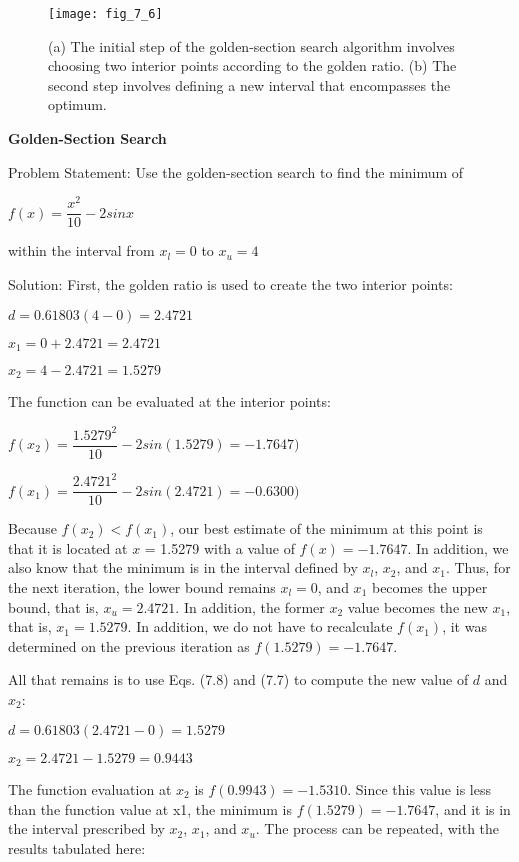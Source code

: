 \documentclass[../main.tex]{subfiles}
\begin{document}
\begin{figure}[H]
	\centering
	\texttt{[image: fig\_7\_6]}
	\caption{\textsf{(a) The initial step of the golden-section search algorithm involves choosing two interior points
	according to the golden ratio. (b) The second step involves defining a new interval that
	encompasses the optimum.}}
	\label{fig:fig_7_6}
\end{figure}


\begin{example}
	\textbf{Golden-Section Search}
	\smallskip
	
	\noindent Problem Statement:
	Use the golden-section search to find the minimum of

	$f(x)=\dfrac{x^2}{10}-2sin{x}$

	\noindent within the interval from $x_l=0$ to $x_u=4$

	\noindent Solution: First, the golden ratio is used to create the two interior points:
	\medskip

	$d = 0.61803(4 - 0) = 2.4721$
	\medskip

	$x_1 = 0 + 2.4721 = 2.4721$
	\medskip

	$x_2 = 4 - 2.4721 = 1.5279$
	\medskip

	\noindent The function can be evaluated at the interior points:
	\medskip

	$f(x_2) = \dfrac{1.5279^2}{10}-2sin(1.5279) = -1.7647)$
	\medskip

	$f(x_1) = \dfrac{2.4721^2}{10}-2sin(2.4721) = -0.6300)$
	\medskip

	Because $f(x_2)< f(x_1)$, our best estimate of the minimum at this point is that it is
	located at $x$ = 1.5279 with a value of $f(x) = -1.7647$. In addition, we also know that the
	minimum is in the interval defined by $x_l$, $x_2$, and $x_1$. Thus, for the next iteration, the lower
	bound remains $x_l = 0$, and $x_1$ becomes the upper bound, that is, $x_u = 2.4721$. In addition,
	the former $x_2$ value becomes the new $x_1$, that is, $x_1 = 1.5279$. In addition, we do not have to
	recalculate $f(x_1)$, it was determined on the previous iteration as $f(1.5279)=-1.7647$.

	All that remains is to use Eqs. (7.8) and (7.7) to compute the new value of $d$ and $x_2$:
	\medskip

	$d = 0.61803(2.4721 - 0) = 1.5279$
	\medskip

	$x_2 = 2.4721 - 1.5279 = 0.9443$

	\newpage
	The function evaluation at $x_2$ is $f(0.9943) = -1.5310$. Since this value is less than the
	function value at x1, the minimum is $f(1.5279) = -1.7647$, and it is in the interval prescribed
	by $x_2$, $x_1$, and $x_u$. The process can be repeated, with the results tabulated here:
	

\end{example}
\end{document}
